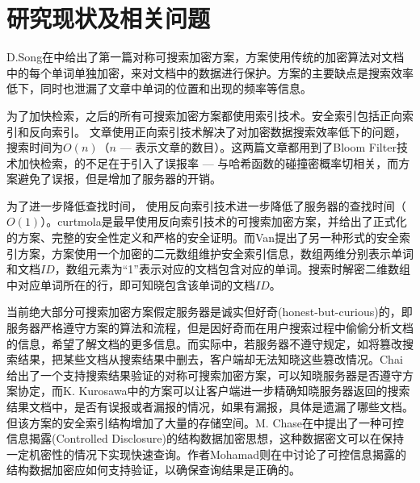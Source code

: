 \section{研究现状及相关问题}
\label{sec:introduction_modern}

D.Song在\cite{song2000practical}中给出了第一篇对称可搜索加密方案，方案使用传统的加密算法对文档中的每个单词单独加密，来对文档中的数据进行保护。方案的主要缺点是搜索效率低下，同时也泄漏了文章中单词的位置和出现的频率等信息。

为了加快检索，之后的所有可搜索加密方案都使用索引技术。安全索引包括正向索引和反向索引。
文章\cite{goh2003secure}\cite{chang2005privacy}使用正向索引技术解决了对加密数据搜索效率低下的问题，搜索时间为$O(n)$（$n$ --- 表示文章的数目）。这两篇文章都用到了Bloom Filter技术加快检索，\cite{goh2003secure}的不足在于引入了误报率 --- 与哈希函数的碰撞密概率切相关，而方案\cite{chang2005privacy}避免了误报，但是增加了服务器的开销。


为了进一步降低查找时间，\cite{curtmola2006searchable}\cite{van2010computationally} 使用反向索引技术进一步降低了服务器的查找时间（$O(1)$）。curtmola\cite{curtmola2006searchable}是最早使用反向索引技术的可搜索加密方案，并给出了正式化的方案、完整的安全性定义和严格的安全证明。而Van\cite{van2010computationally}提出了另一种形式的安全索引方案，方案使用一个加密的二元数组维护安全索引信息，数组两维分别表示单词和文档$ID$，数组元素为“1”表示对应的文档包含对应的单词。搜索时解密二维数组中对应单词所在的行，即可知晓包含该单词的文档$ID$。

当前绝大部分可搜索加密方案假定服务器是诚实但好奇(honest-but-curious)的，即服务器严格遵守方案的算法和流程，但是因好奇而在用户搜索过程中偷偷分析文档的信息，希望了解文档的更多信息。而实际中，若服务器不遵守规定，如将篡改搜索结果，把某些文档从搜索结果中删去，客户端却无法知晓这些篡改情况。Chai \cite{chai2012verifiable}\cite{kurosawa2012uc}给出了一个支持搜索结果验证的对称可搜索加密方案，可以知晓服务器是否遵守方案协定，而K. Kurosawa\cite{kurosawa2012uc}中的方案可以让客户端进一步精确知晓服务器返回的搜索结果文档中，是否有误报或者漏报的情况，如果有漏报，具体是遗漏了哪些文档。但该方案的安全索引结构增加了大量的存储空间。M. Chase在\cite{chase2010structured}中提出了一种可控信息揭露(Controlled Disclosure)的结构数据加密思想，这种数据密文可以在保持一定机密性的情况下实现快速查询。作者Mohamad则在\cite{boneh2003identity}中讨论了可控信息揭露的结构数据加密应如何支持验证，以确保查询结果是正确的。

